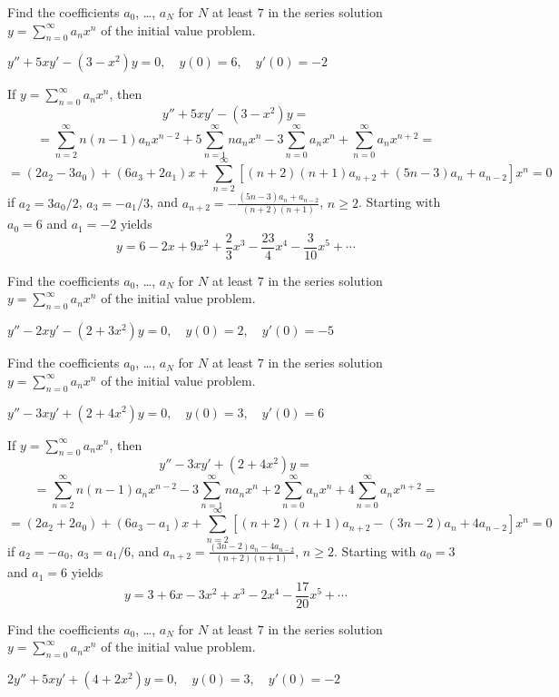 \documentclass{ximera}
\begin{document}
\begin{problem}\label{exer:7.3.34}
Find
the coefficients  $a_0$, \dots, $a_N$ for $N$ at least $7$ in the series
solution
$y=\sum_{n=0}^\infty a_nx^n$
 of the initial value problem.
 
$y''+5xy'-(3-x^2)y=0,\quad y(0)=6,\quad y'(0)=-2$

\begin{solution}
    If $y=\sum_{n=0}^\infty a_nx^n$, then
$$y''+5xy'-(3-x^2)y=$$
$$=\sum_{n=2}^\infty n(n-1)a_nx^{n-2}
+5\sum_{n=1}^\infty na_nx^n
-3\sum_{n=0}^\infty a_nx^n
+\sum_{n=0}^\infty a_nx^{n+2}=$$
$$=(2a_2-3a_0)+(6a_3+2a_1)x+
\sum_{n=2}^\infty[(n+2)(n+1)a_{n+2}+(5n-3)a_n+a_{n-2}]x^n=0$$ if
$a_2=3a_0/2$, $a_3=-a_1/3$, and
$a_{n+2}=-\frac{(5n-3)a_n+a_{n-2}}{(n+2)(n+1)}$,
 $n\geq 2$.
Starting with $a_0=6$ and $a_1=-2$ yields
$$y=6-2x+9x^2+\frac{2}{3}x^3-\frac{23}{4}x^4-\frac{3}{10}x^5+\cdots$$
\end{solution}
\end{problem}


\begin{problem}\label{exer:7.3.35}
Find
the coefficients  $a_0$, \dots, $a_N$ for $N$ at least $7$ in the series
solution
$y=\sum_{n=0}^\infty a_nx^n$
 of the initial value problem.
 
$y''-2xy'-(2+3x^2)y=0,\quad y(0)=2,\quad y'(0)=-5$
\end{problem}


\begin{problem}\label{exer:7.3.36}
Find
the coefficients  $a_0$, \dots, $a_N$ for $N$ at least $7$ in the series
solution
$y=\sum_{n=0}^\infty a_nx^n$
 of the initial value problem.
 
$y''-3xy'+(2+4x^2)y=0,\quad y(0)=3,\quad y'(0)=6$

\begin{solution}
    If $y=\sum_{n=0}^\infty a_nx^n$, then
$$y''-3xy'+(2+4x^2)y=$$
$$=\sum_{n=2}^\infty n(n-1)a_nx^{n-2}
-3\sum_{n=1}^\infty na_nx^n
+2\sum_{n=0}^\infty a_nx^n
+4\sum_{n=0}^\infty a_nx^{n+2}=$$
$$=(2a_2+2a_0)+(6a_3-a_1)x+
\sum_{n=2}^\infty[(n+2)(n+1)a_{n+2}-(3n-2)a_n+4a_{n-2}]x^n=0$$ if
$a_2=-a_0$, $a_3=a_1/6$, and
$a_{n+2}=\frac{(3n-2)a_n-4a_{n-2}}{(n+2)(n+1)}$,
 $n\geq 2$.
Starting with $a_0=3$ and $a_1=6$ yields
$$y=3+6x-3x^2+x^3-2x^4-\frac{17}{20}x^5+\cdots$$
\end{solution}
\end{problem}

\begin{problem}\label{exer:7.3.37}
Find
the coefficients  $a_0$, \dots, $a_N$ for $N$ at least $7$ in the series
solution
$y=\sum_{n=0}^\infty a_nx^n$
 of the initial value problem.
 
$2y''+5xy'+(4+2x^2)y=0,\quad y(0)=3,\quad y'(0)=-2$
\end{problem}
\end{document}
